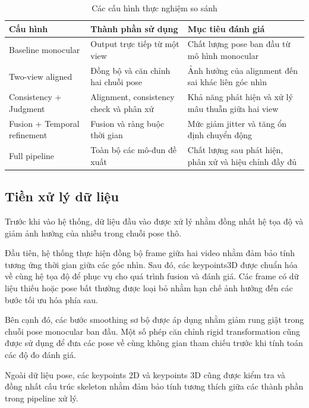 \documentclass[../DoAn.tex]{subfiles}
\begin{document}
\begin{table}[H]
\centering
\caption{Các cấu hình thực nghiệm so sánh}
\label{tab:ablation_design}
\begin{tabular}{|p{3.6cm}|p{4.8cm}|p{4.8cm}|}
\hline
\textbf{Cấu hình} & \textbf{Thành phần sử dụng} & \textbf{Mục tiêu đánh giá} \\
\hline
Baseline monocular & Output trực tiếp từ một view \cite{shin2024wham} & Chất lượng pose ban đầu từ mô hình monocular \\
\hline
Two-view aligned & Đồng bộ và căn chỉnh hai chuỗi pose \cite{gu2024multiview} & Ảnh hưởng của alignment đến sai khác liên góc nhìn \\
\hline
Consistency + Judgment & Alignment, consistency check và phân xử \cite{vu2026multiperspective} & Khả năng phát hiện và xử lý mâu thuẫn giữa hai view \\
\hline
Fusion + Temporal refinement & Fusion và ràng buộc thời gian \cite{physcap2020} & Mức giảm jitter và tăng ổn định chuyển động \\
\hline
Full pipeline & Toàn bộ các mô-đun đề xuất & Chất lượng sau phát hiện, phân xử và hiệu chỉnh đầy đủ \\
\hline
\end{tabular}
\end{table}

\subsection{Tiền xử lý dữ liệu}

Trước khi vào hệ thống, dữ liệu đầu vào được xử lý nhằm đồng nhất hệ tọa độ và giảm ảnh hưởng của nhiễu trong chuỗi pose thô.

Đầu tiên, hệ thống thực hiện đồng bộ frame giữa hai video nhằm đảm bảo tính tương ứng thời gian giữa các góc nhìn. Sau đó, các keypoints3D được chuẩn hóa về cùng hệ tọa độ để phục vụ cho quá trình fusion và đánh giá. Các frame có dữ liệu thiếu hoặc pose bất thường được loại bỏ nhằm hạn chế ảnh hưởng đến các bước tối ưu hóa phía sau.

Bên cạnh đó, các bước smoothing sơ bộ được áp dụng nhằm giảm rung giật trong chuỗi pose monocular ban đầu. Một số phép căn chỉnh rigid transformation cũng được sử dụng để đưa các pose về cùng không gian tham chiếu trước khi tính toán các độ đo đánh giá.

Ngoài dữ liệu pose, các keypoints 2D và keypoints 3D cũng được kiểm tra và đồng nhất cấu trúc skeleton nhằm đảm bảo tính tương thích giữa các thành phần trong pipeline xử lý.
\end{document}
